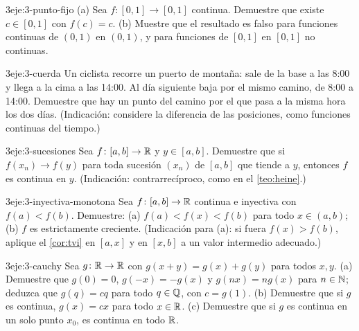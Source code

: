 \begin{ejercicio}{3}{eje:3-punto-fijo}
(a) Sea $f\colon[0,1]\to[0,1]$ continua. Demuestre que existe $c\in[0,1]$ con $f(c)=c$. (b) Muestre que el resultado es falso para funciones continuas de $(0,1)$ en $(0,1)$, y para funciones de $[0,1]$ en $[0,1]$ no continuas.
\end{ejercicio}

\begin{ejercicio}{3}{eje:3-cuerda}
Un ciclista recorre un puerto de montaña: sale de la base a las 8:00 y llega a la cima a las 14:00. Al día siguiente baja por el mismo camino, de 8:00 a 14:00. Demuestre que hay un punto del camino por el que pasa a la misma hora los dos días. (Indicación: considere la diferencia de las posiciones, como funciones continuas del tiempo.)
\end{ejercicio}

\begin{ejercicio}{3}{eje:3-sucesiones}
Sea $f\colon[a,b]\to\mathbb{R}$ y $y\in[a,b]$. Demuestre que si $f(x_n)\to f(y)$ para toda sucesión $(x_n)$ de $[a,b]$ que tiende a $y$, entonces $f$ es continua en $y$. (Indicación: contrarrecíproco, como en el \cref{teo:heine}.)
\end{ejercicio}

\begin{ejercicio}{3}{eje:3-inyectiva-monotona}
Sea $f\colon[a,b]\to\mathbb{R}$ continua e inyectiva con $f(a)<f(b)$. Demuestre: (a) $f(a)<f(x)<f(b)$ para todo $x\in(a,b)$; (b) $f$ es estrictamente creciente. (Indicación para (a): si fuera $f(x)>f(b)$, aplique el \cref{cor:tvi} en $[a,x]$ y en $[x,b]$ a un valor intermedio adecuado.)
\end{ejercicio}

\begin{ejercicio}{3}{eje:3-cauchy}
Sea $g\colon\mathbb{R}\to\mathbb{R}$ con $g(x+y)=g(x)+g(y)$ para todos $x,y$. (a) Demuestre que $g(0)=0$, $g(-x)=-g(x)$ y $g(nx)=ng(x)$ para $n\in\mathbb{N}$; deduzca que $g(q)=cq$ para todo $q\in\mathbb{Q}$, con $c=g(1)$. (b) Demuestre que si $g$ es continua, $g(x)=cx$ para todo $x\in\mathbb{R}$. (c) Demuestre que si $g$ es continua en un solo punto $x_0$, es continua en todo $\mathbb{R}$.
\end{ejercicio}

